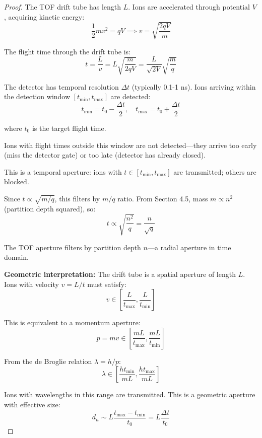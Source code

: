 \begin{proof}
The TOF drift tube has length $L$. Ions are accelerated through potential $V$, acquiring kinetic energy:
\begin{equation}
\frac{1}{2}mv^2 = qV \implies v = \sqrt{\frac{2qV}{m}}
\end{equation}

The flight time through the drift tube is:
\begin{equation}
t = \frac{L}{v} = L\sqrt{\frac{m}{2qV}} = \frac{L}{\sqrt{2V}} \sqrt{\frac{m}{q}}
\end{equation}

The detector has temporal resolution $\Delta t$ (typically 0.1-1 ns). Ions arriving within the detection window $[t_{\min}, t_{\max}]$ are detected:
\begin{equation}
t_{\min} = t_0 - \frac{\Delta t}{2}, \quad t_{\max} = t_0 + \frac{\Delta t}{2}
\end{equation}

where $t_0$ is the target flight time.

Ions with flight times outside this window are not detected—they arrive too early (miss the detector gate) or too late (detector has already closed).

This is a temporal aperture: ions with $t \in [t_{\min}, t_{\max}]$ are transmitted; others are blocked.

Since $t \propto \sqrt{m/q}$, this filters by $m/q$ ratio. From Section 4.5, mass $m \propto n^2$ (partition depth squared), so:
\begin{equation}
t \propto \sqrt{\frac{n^2}{q}} = \frac{n}{\sqrt{q}}
\end{equation}

The TOF aperture filters by partition depth $n$—a radial aperture in time domain.

\textbf{Geometric interpretation:} The drift tube is a spatial aperture of length $L$. Ions with velocity $v = L/t$ must satisfy:
\begin{equation}
v \in \left[\frac{L}{t_{\max}}, \frac{L}{t_{\min}}\right]
\end{equation}

This is equivalent to a momentum aperture:
\begin{equation}
p = mv \in \left[\frac{mL}{t_{\max}}, \frac{mL}{t_{\min}}\right]
\end{equation}

From the de Broglie relation $\lambda = h/p$:
\begin{equation}
\lambda \in \left[\frac{ht_{\min}}{mL}, \frac{ht_{\max}}{mL}\right]
\end{equation}

Ions with wavelengths in this range are transmitted. This is a geometric aperture with effective size:
\begin{equation}
d_n \sim L \frac{t_{\max} - t_{\min}}{t_0} = L \frac{\Delta t}{t_0}
\end{equation}
\end{proof}

